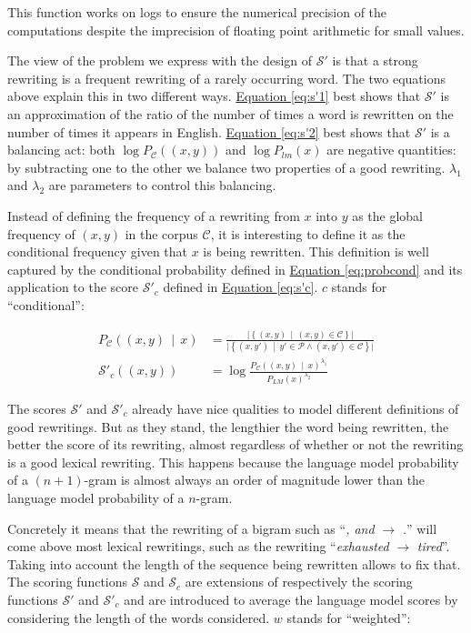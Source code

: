 \documentclass[a4paper, 11pt, onepage]{scrreprt}
\newcommand\equaref[1]{\hyperref[#1]{Equation \ref*{#1}}}
\newcommand\card[1]{\lvert #1 \rvert}
\newcommand\suchthat{\, \middle| \,}
\newcommand\given{\, \middle| \,}
\newcommand\proba[2][]{P_{#1} \left( #2 \right)}
\begin{document}
This function works on logs to ensure the numerical precision of the
computations despite the imprecision of floating point arithmetic for
small values.

The view of the problem we express with the design of $\mathcal{S'}$
is that a strong rewriting is a frequent rewriting of a rarely
occurring word. The two equations above explain this in two different
ways. \equaref{eq:s'1} best shows that $\mathcal{S'}$ is an
approximation of the ratio of the number of times a word is rewritten
on the number of times it appears in English. \equaref{eq:s'2} best
shows that $\mathcal{S'}$ is a balancing act: both $\log
\proba[\mathcal{C}]{(x, y)}$ and $\log \proba[lm]{x}$ are negative
quantities: by subtracting one to the other we balance two properties
of a good rewriting. $\lambda_1$ and $\lambda_2$ are parameters to
control this balancing.

Instead of defining the frequency of a rewriting from $x$ into $y$ as
the global frequency of $(x, y)$ in the corpus $\mathcal{C}$, it is
interesting to define it as the conditional frequency given that $x$
is being rewritten. This definition is well captured by the
conditional probability defined in \equaref{eq:probcond} and its
application to the score $\mathcal{S'}_{c}$ defined in
\equaref{eq:s'c}. $c$ stands for “conditional”:

\begin{align}
  \label{eq:probcond}
  \proba[\mathcal{C}]{(x, y) \given x} & = \frac%
  {\card{\left\{(x, y) \suchthat (x, y) \in \mathcal{C}\right\}}}%
  {\card{\left\{(x, y') \suchthat y' \in \mathcal{P} \land (x, y') \in
        \mathcal{C}\right\}}} \\
  \label{eq:s'c}
  \mathcal{S'}_{c}((x, y)) & = \log \frac%
  {\proba[\mathcal{C}]{(x, y) \given x}^{\lambda_1}}%
  {\proba[LM]{x}^{\lambda_2}}
\end{align}

The scores $\mathcal{S'}$ and $\mathcal{S'}_c$ already have
nice qualities to model different definitions of good rewritings. But
as they stand, the lengthier the word being rewritten, the better the
score of its rewriting, almost regardless of whether or not the
rewriting is a good lexical rewriting. This happens because the
language model probability of a $(n+1)$-gram is almost always an order
of magnitude lower than the language model probability of a
$n$-gram.

Concretely it means that the rewriting of a bigram such as “\emph{,
  and} $\rightarrow$ \emph{.}”  will come above most lexical
rewritings, such as the rewriting “\emph{exhausted} $\rightarrow$
\emph{tired}”. Taking into account the length of the sequence being
rewritten allows to fix that. The scoring functions $\mathcal{S}$ and
$\mathcal{S}_c$ are extensions of respectively the scoring functions
$\mathcal{S'}$ and $\mathcal{S'}_c$ and are introduced to average the
language model scores by considering the length of the words
considered. $w$ stands for “weighted”:
\end{document}
